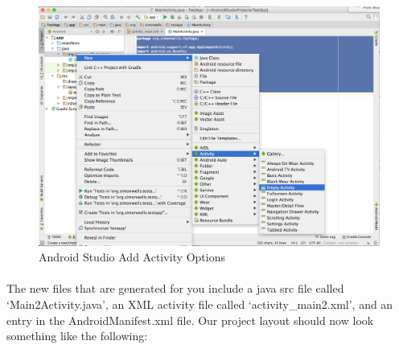 \begin{figure}[H]
\centering
\includegraphics[width=\textwidth]{images/activities_add_activity_studio}
\caption{Android Studio Add Activity Options}
\label{fig:activities_add_activity_studio}
\end{figure}


\paragraph{} The new files that are generated for you include a java src file called `Main2Activity.java', an XML activity file called `activity\_main2.xml', and an entry in the AndroidManifest.xml file. Our project layout should now look something like the following:

